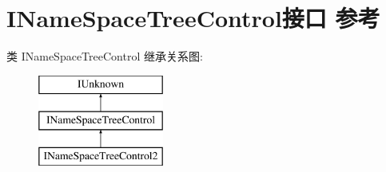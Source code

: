 \hypertarget{interface_i_name_space_tree_control}{}\section{I\+Name\+Space\+Tree\+Control接口 参考}
\label{interface_i_name_space_tree_control}
类 I\+Name\+Space\+Tree\+Control 继承关系图\+:\begin{figure}[H]
\begin{center}
\leavevmode
\includegraphics[height=3.000000cm]{interface_i_name_space_tree_control}
\end{center}
\end{figure}
